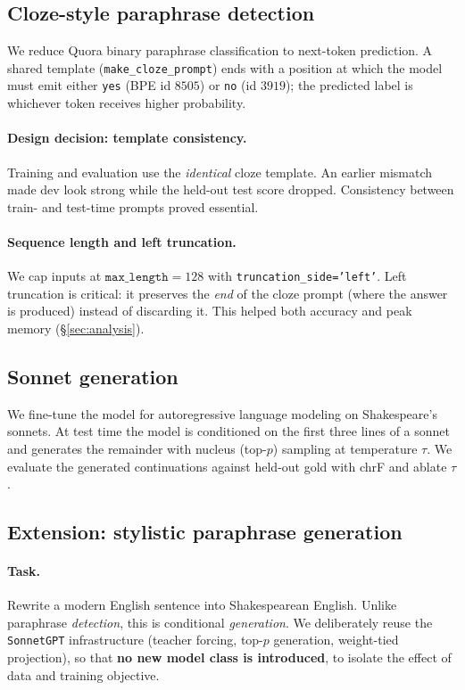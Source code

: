 \documentclass[10pt,twocolumn]{article}
\begin{document}
\subsection{Cloze-style paraphrase detection}
\label{sec:paraphrase}
We reduce Quora binary paraphrase classification to next-token prediction. A
shared template (\texttt{make\_cloze\_prompt}) ends with a position at which the
model must emit either \texttt{yes} (BPE id $8505$) or \texttt{no} (id $3919$);
the predicted label is whichever token receives higher probability.

\paragraph{Design decision: template consistency.} Training and evaluation use
the \emph{identical} cloze template. An earlier mismatch made dev look strong
while the held-out test score dropped. Consistency between train- and
test-time prompts proved essential.

\paragraph{Sequence length and left truncation.} We cap inputs at
$\texttt{max\_length}{=}128$ with \texttt{truncation\_side='left'}. Left
truncation is critical: it preserves the \emph{end} of the cloze prompt (where
the answer is produced) instead of discarding it. This helped both accuracy and
peak memory (\S\ref{sec:analysis}).

\subsection{Sonnet generation}
\label{sec:sonnet}
We fine-tune the model for autoregressive language modeling on Shakespeare's
sonnets. At test time the model is conditioned on the first three lines of a
sonnet and generates the remainder with nucleus (top-$p$) sampling
\cite{holtzman2020curious} at temperature $\tau$. We evaluate the generated
continuations against held-out gold with chrF \cite{popovic2015chrf} and ablate
$\tau$.

\subsection{Extension: stylistic paraphrase generation}
\label{sec:extension}
\paragraph{Task.} Rewrite a modern English sentence into Shakespearean English.
Unlike paraphrase \emph{detection}, this is conditional \emph{generation}. We
deliberately reuse the \texttt{SonnetGPT} infrastructure (teacher forcing,
top-$p$ generation, weight-tied projection), so that \textbf{no new model class is
introduced}, to isolate the effect of data and training objective.
\end{document}
